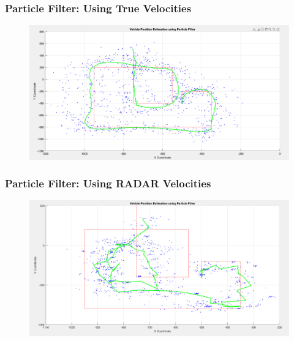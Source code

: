 \documentclass{beamer}
\begin{document}
\begin{frame}
\frametitle{Particle Filter: Using True Velocities}
\begin{figure}
\includegraphics[width=1.0\linewidth]{PF_results.png}
\end{figure}
\end{frame}

\begin{frame}
\frametitle{Particle Filter: Using RADAR Velocities}
\begin{figure}
\includegraphics[width=1.0\linewidth]{PF_results2.png}
\end{figure}
\end{frame}
\end{document}
